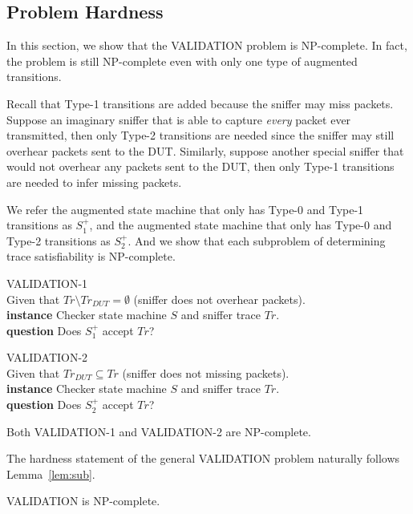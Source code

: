 \subsection{Problem Hardness}
\label{subsec:hard}

In this section, we show that the VALIDATION problem is NP-complete. In
fact, the problem is still NP-complete even with only one type of augmented
transitions.

Recall that Type-1 transitions are added because the sniffer may miss packets.
Suppose an imaginary sniffer that is able to capture \textit{every} packet ever
transmitted, then only Type-2 transitions are needed since the sniffer may still
overhear packets sent to the DUT. Similarly, suppose another special sniffer
that would not overhear any packets sent to the DUT, then only Type-1
transitions are needed to infer missing packets.

We refer the augmented state machine that only has Type-0 and Type-1
transitions as $S^+_1$, and the augmented state machine that only has Type-0 and
Type-2 transitions as $S^+_2$. And we show that each subproblem of determining
trace satisfiability is NP-complete.

\begin{problem}
  VALIDATION-1\\
  Given that $Tr\setminus Tr_{DUT}=\emptyset$ (sniffer does not overhear
  packets).\\
  \textbf{instance} Checker state machine $S$ and sniffer trace $Tr$.\\
  \textbf{question} Does $S^+_1$ accept $Tr$?
\end{problem}

\begin{problem}
  VALIDATION-2\\
  Given that $Tr_{DUT} \subseteq Tr$ (sniffer does not missing packets).\\
  \textbf{instance} Checker state machine $S$ and sniffer trace $Tr$.\\
  \textbf{question} Does $S^+_2$ accept $Tr$?
\end{problem}

\begin{lemma}
  \label{lem:sub}
  Both VALIDATION-1 and VALIDATION-2 are NP-complete.
\end{lemma}

The hardness statement of the general VALIDATION problem naturally follows
Lemma~\ref{lem:sub}.

\begin{theorem}
  VALIDATION is NP-complete.
\end{theorem}
